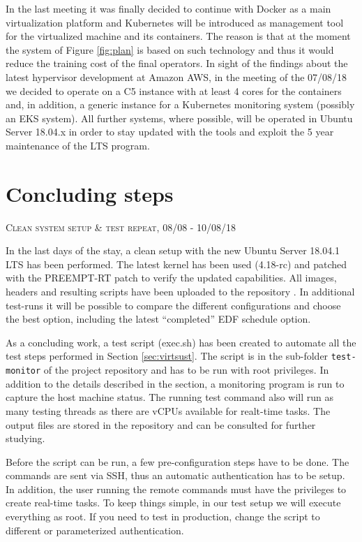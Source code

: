 \documentclass[]{scrartcl}
\begin{document}
In the last meeting it was finally decided to continue with Docker as a main virtualization platform and Kubernetes will be introduced as management tool for the virtualized machine and its containers.
The reason is that at the moment the system of Figure \ref{fig:plan} is based on such technology and thus it would reduce the training cost of the final operators.
In sight of the findings about the latest hypervisor development at Amazon AWS, in the meeting of the 07/08/18 we decided to operate on a C5 instance with at least 4 cores for the containers and, in addition, a generic instance for a Kubernetes monitoring system (possibly an EKS system). All further systems, where possible, will be operated in Ubuntu Server 18.04.x in order to stay updated with the tools and exploit the 5 year maintenance of the LTS program.

\section{Concluding steps}

{\small\textsc{Clean system setup \& test repeat, 08/08 - 10/08/18} \bigskip}

In the last days of the stay, a clean setup with the new Ubuntu Server 18.04.1 LTS has been performed. The latest kernel has been used (4.18-rc) and patched with the PREEMPT-RT patch to verify the updated capabilities. 
All images, headers and resulting scripts have been uploaded to the repository \cite{gitrepo}. In additional test-runs it will be possible to compare the different configurations and choose the best option, including the latest ``completed'' EDF schedule option.

As a concluding work, a test script (exec.sh) has been created to automate all the test steps performed in Section \ref{sec:virtsust}. The script is in the sub-folder \texttt{test-monitor} of the project repository \cite{gitrepo} and has to be run with root privileges.
In addition to the details described in the section, a monitoring program is run to capture the host machine status. The running test command also will run as many testing threads as there are vCPUs available for realt-time tasks. The output files are stored in the repository and can be consulted for further studying.

Before the script can be run, a few pre-configuration steps have to be done. The commands are sent via SSH, thus an automatic authentication has to be setup. In addition, the user running the remote commands must have the privileges to create real-time tasks.
To keep things simple, in our test setup we will execute everything as root. If you need to test in production, change the script to different or parameterized authentication.
\end{document}
